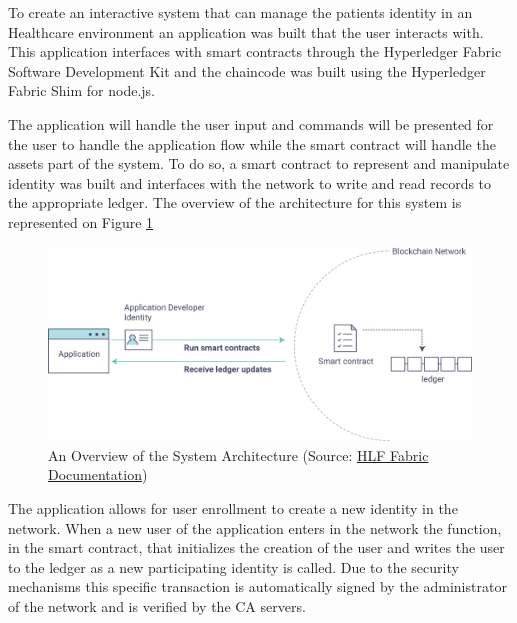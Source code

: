 \documentclass[]{llncs}
\begin{document}
To create an interactive system that can manage the patients identity in an Healthcare environment 
an application was built that the user interacts with. 
This application interfaces with smart contracts through the Hyperledger Fabric Software Development Kit
and the chaincode was built using the Hyperledger Fabric Shim for node.js.

The application will handle the user input and commands will be presented for the user to handle 
the application flow while the smart contract will handle the assets part of the system.
To do so, a smart contract to represent and manipulate identity was built and interfaces with the network 
to write and read records to the appropriate ledger. The overview of the architecture for this system is
represented on Figure \ref{fig:appOverview}

\begin{figure}[ht]
\centering
\includegraphics[width=1\linewidth]{images/hyperledgerAppOverview.png}
\caption{\label{fig:appOverview}An Overview of the System Architecture (Source: \href{http://hyperledger-fabric.readthedocs.io/en/latest/write_first_app.html}{HLF Fabric Documentation})}
\end{figure}

The application allows for user enrollment to create a new identity in the network.
When a new user of the application enters in the network the function, in the smart contract, 
that initializes the creation of the user and writes the user to the ledger as a new participating 
identity is called. Due to the security mechanisms this specific transaction is automatically signed by the
administrator of the network and is verified by the CA servers.
\end{document}
